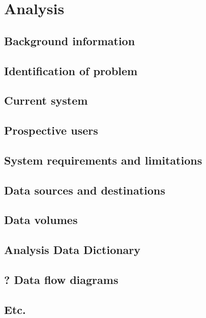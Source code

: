 \section{Analysis}

\subsection{Background information}
\subsection{Identification of problem}
\subsection{Current system}
\subsection{Prospective users}
\subsection{System requirements and limitations}
\subsection{Data sources and destinations}
\subsection{Data volumes}
\subsection{Analysis Data Dictionary}
\subsection{? Data flow diagrams}
\subsection{Etc.}
